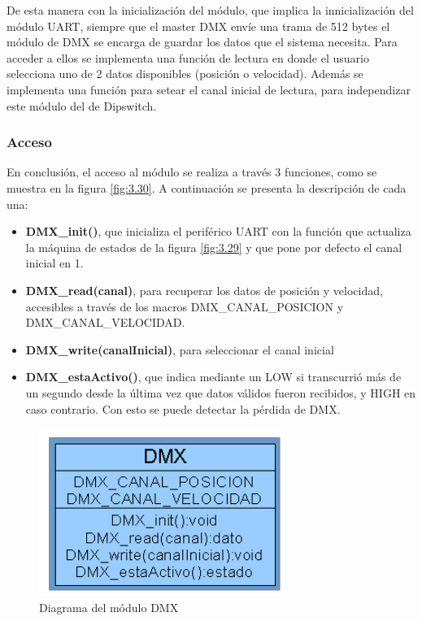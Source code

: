 De esta manera con la inicialización del módulo, que implica la innicialización del módulo UART, siempre que el master DMX envíe una trama de 512 bytes el módulo de DMX se encarga de guardar los datos que el sistema necesita. Para acceder a ellos se implementa una función de lectura en donde el usuario selecciona uno de 2 datos disponibles (posición o velocidad). Además se implementa una función para setear el canal inicial de lectura, para independizar este módulo del de Dipswitch.

\subsubsection{Acceso}
En conclusión, el acceso al módulo se realiza a través 3 funciones, como se muestra en la figura \ref{fig:3.30}. A continuación se presenta la descripción de cada una:
\begin{itemize}
	\item \textbf{DMX\_init()}, que inicializa el periférico UART con la función que actualiza la máquina de estados de la figura \ref{fig:3.29} y que pone por defecto el canal inicial en 1.
	\item \textbf{DMX\_read(canal)}, para recuperar los datos de posición y velocidad, accesibles a través de los macros DMX\_CANAL\_POSICION y DMX\_CANAL\_VELOCIDAD.
	\item \textbf{DMX\_write(canalInicial)}, para seleccionar el canal inicial
	\item \textbf{DMX\_estaActivo()}, que indica mediante un LOW si transcurrió más de un segundo desde la última vez que datos válidos fueron recibidos, y HIGH en caso contrario. Con esto se puede detectar la pérdida de DMX.
\end{itemize}

\begin{figure}[!ht]
	\centering
	\includegraphics[width=8cm,scale=1]{resources/3_30-moduloDMX.png}
	\caption{Diagrama del módulo DMX}
	\label{fig:\thefigure}
\end{figure}
 

